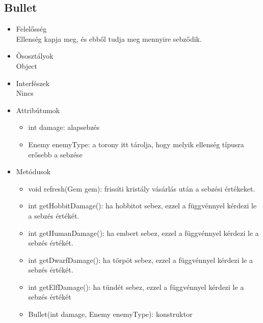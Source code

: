 \subsection{Bullet}
\begin{itemize}
\item Felelősség\\
Ellenség kapja meg, és ebből tudja meg mennyire sebződik.
\item Ősosztályok\\
Object
\item Interfészek\\
Nincs
\item Attribútumok\\
	\begin{itemize}
		\item int damage: alapsebzés
		\item Enemy enemyType: a torony itt tárolja, hogy melyik ellenség típusra erősebb a sebzése
	\end{itemize}
\item Metódusok\\
	\begin{itemize}
		\item void refresh(Gem gem): frissíti kristály vásárlás után a sebzési értékeket.
		\item int getHobbitDamage(): ha hobbitot sebez, ezzel a függvénnyel kérdezi le a sebzés értékét. 
		\item int getHumanDamage(): ha embert sebez, ezzel a függvénnyel kérdezi le a sebzés értékét.
		\item int getDwarfDamage(): ha törpöt sebez, ezzel a függvénnyel kérdezi le a sebzés értékét.
		\item int getElfDamage(): ha tündét sebez, ezzel a függvénnyel kérdezi le a sebzés értékét
		\item Bullet(int damage, Enemy enemyType): konstruktor
		
		
	\end{itemize}
\end{itemize}


